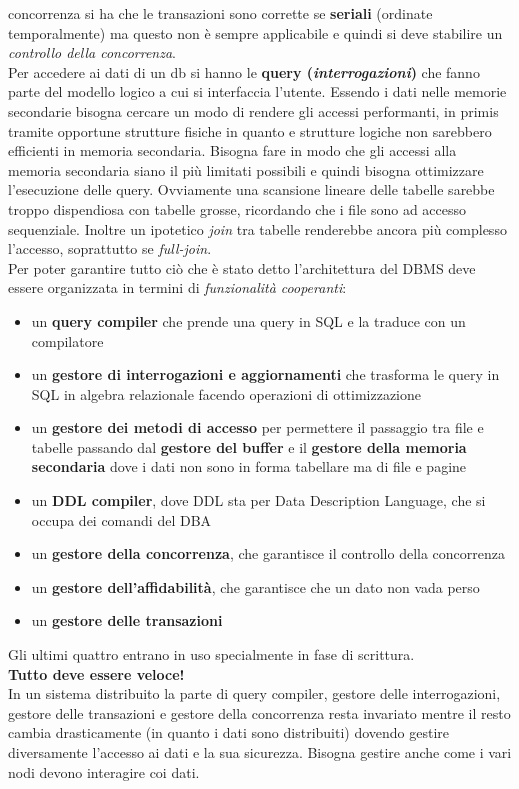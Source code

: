 \documentclass[a4paper,12pt, oneside]{book}
\begin{document}
concorrenza si ha che le transazioni sono corrette se \textbf{seriali} (ordinate
temporalmente) ma questo non è sempre applicabile e quindi si deve stabilire un
\textit{controllo della concorrenza}.\\
Per accedere ai dati di un db si hanno le \textbf{query
  (\textit{interrogazioni})} che fanno parte del modello logico a cui si
interfaccia l'utente. Essendo i dati nelle memorie secondarie bisogna cercare un
modo di rendere gli accessi performanti, in primis tramite opportune strutture
fisiche in quanto e strutture logiche non sarebbero efficienti in memoria
secondaria. Bisogna fare in modo che gli accessi alla memoria secondaria siano
il più limitati possibili e quindi bisogna ottimizzare l'esecuzione delle query.
Ovviamente una scansione lineare delle tabelle sarebbe troppo dispendiosa con
tabelle grosse, ricordando che i file sono ad accesso sequenziale. Inoltre un
ipotetico \textit{join} tra tabelle renderebbe ancora più complesso l'accesso,
soprattutto se \textit{full-join}.\\
Per poter garantire tutto ciò che è stato detto l'architettura del DBMS deve
essere organizzata in termini di \textit{funzionalità cooperanti}:
\begin{itemize}
  \item un \textbf{query compiler} che prende una query in SQL e la traduce con
  un compilatore
  \item un \textbf{gestore di interrogazioni e aggiornamenti} che trasforma le
  query in SQL in algebra relazionale facendo operazioni di ottimizzazione
  \item un \textbf{gestore dei metodi di accesso} per permettere il passaggio
  tra file e tabelle passando dal \textbf{gestore del buffer} e il
  \textbf{gestore della memoria secondaria} dove i dati non sono in forma
  tabellare ma di file e pagine
  \item un \textbf{DDL compiler}, dove DDL sta per Data Description Language,
  che si occupa dei comandi del DBA
  \item un \textbf{gestore della concorrenza}, che garantisce il controllo della
  concorrenza
  \item un \textbf{gestore dell'affidabilità}, che garantisce che un dato non
  vada perso
  \item un \textbf{gestore delle transazioni}
\end{itemize}
Gli ultimi quattro entrano in uso specialmente in fase di scrittura.\\
\textbf{Tutto deve essere veloce!}\\
In un sistema distribuito la parte di query compiler, gestore delle
interrogazioni, gestore delle transazioni e gestore della concorrenza resta
invariato mentre il resto cambia drasticamente (in quanto i dati sono
distribuiti) dovendo gestire diversamente l'accesso ai dati e la sua
sicurezza. Bisogna gestire anche come i vari nodi devono interagire coi dati.
\end{document}
